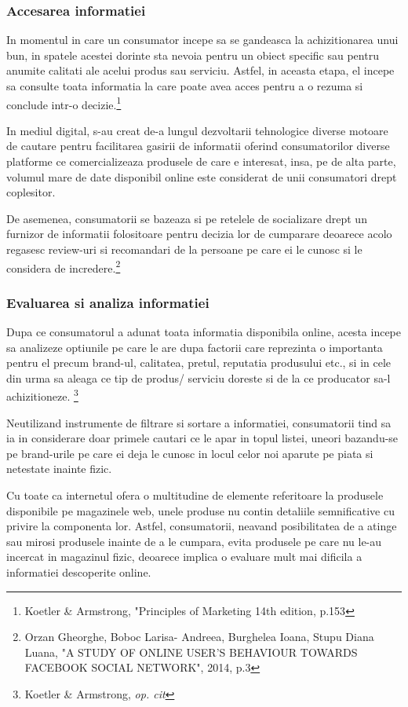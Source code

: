 \documentclass[a4paper, 12pt]{article}
\begin{document}
		\subsubsection{Accesarea informatiei}
		\quad\quad
		 In momentul in care un consumator incepe sa se gandeasca la  achizitionarea unui bun, in spatele acestei dorinte sta nevoia pentru un obiect specific sau pentru anumite calitati ale acelui produs sau serviciu. Astfel, in aceasta etapa, el incepe sa consulte toata informatia la care poate avea acces pentru a o rezuma si conclude intr-o decizie.\footnote{Koetler \& Armstrong, "Principles of Marketing 14th edition, p.153}
		
 		\quad In mediul digital, s-au creat de-a lungul dezvoltarii tehnologice diverse motoare de cautare pentru facilitarea gasirii de informatii oferind consumatorilor diverse platforme ce comercializeaza produsele de care e interesat, insa, pe de alta parte, volumul mare de date disponibil online este considerat de unii consumatori drept coplesitor.
		 
	 	\quad De asemenea, consumatorii se bazeaza  si pe  retelele de socializare drept un furnizor de informatii folositoare pentru decizia lor de cumparare deoarece acolo regasesc review-uri si recomandari de la persoane pe care ei le cunosc si le considera de incredere.\footnote{Orzan Gheorghe, Boboc Larisa- Andreea, Burghelea Ioana, Stupu Diana Luana, "A STUDY OF ONLINE USER’S BEHAVIOUR TOWARDS FACEBOOK SOCIAL NETWORK", 2014, p.3}
		
		\subsubsection{Evaluarea si analiza informatiei }
		
		\quad\quad Dupa ce consumatorul a adunat toata informatia disponibila online, acesta incepe sa analizeze optiunile pe care le are dupa factorii care reprezinta o importanta pentru el precum brand-ul, calitatea, pretul, reputatia produsului etc., si in cele din urma sa aleaga ce tip de produs/ serviciu doreste si de la ce producator sa-l achizitioneze. \footnote{Koetler \& Armstrong, \textit{op. cit}}
		
		\quad Neutilizand instrumente de filtrare si sortare a informatiei, consumatorii tind sa ia in considerare doar primele cautari ce le apar in topul listei, uneori bazandu-se pe brand-urile pe care ei deja le cunosc in locul celor noi aparute pe piata si netestate inainte fizic.
		
		\quad Cu toate ca internetul ofera o multitudine de elemente referitoare la produsele disponibile pe magazinele web, unele produse nu contin detaliile semnificative cu privire la componenta lor. Astfel, consumatorii, neavand posibilitatea de a atinge sau mirosi produsele inainte de a le cumpara, evita produsele pe care nu le-au incercat in magazinul fizic, deoarece implica o evaluare mult mai dificila a informatiei descoperite online.
		
\end{document}
